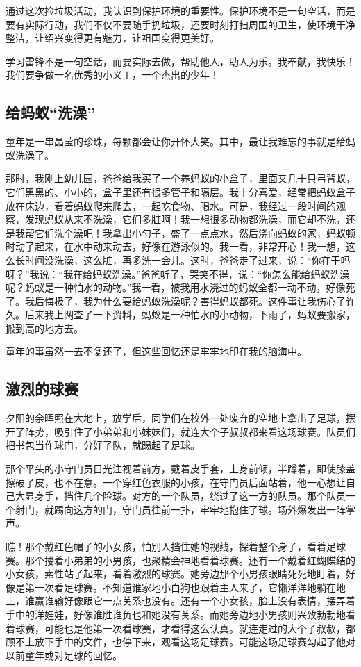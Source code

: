 \documentclass[UTF8,a4paper,titlepage,twoside,10.5pt]{article}
\begin{document}
通过这次捡垃圾活动，我认识到保护环境的重要性。保护环境不是一句空话，而是要有实际行动，我们不仅不要随手扔垃圾，还要时刻打扫周围的卫生，使环境干净整洁，让绍兴变得更有魅力，让祖国变得更美好。

学习雷锋不是一句空话，而要实际去做，帮助他人，助人为乐。我奉献，我快乐！我们要争做一名优秀的小义工，一个杰出的少年！

\subsection{给蚂蚁“洗澡”}
\label{sec:org1d765d4}

童年是一串晶莹的珍珠，每颗都会让你开怀大笑。其中，最让我难忘的事就是给蚂蚁洗澡了。

那时，我刚上幼儿园，爸爸给我买了一个养蚂蚁的小盒子，里面又几十只弓背蚁，它们黑黑的、小小的，盒子里还有很多管子和隔层。我十分喜爱，经常把蚂蚁盒子放在床边，看着蚂蚁爬来爬去，一起吃食物、喝水。可是，我经过一段时间的观察，发现蚂蚁从来不洗澡，它们多脏啊！我一想很多动物都洗澡，而它却不洗，还是我帮它们洗个澡吧！我拿出小勺子，盛了一点点水，然后浇向蚂蚁的家，蚂蚁顿时动了起来，在水中动来动去，好像在游泳似的。我一看，非常开心！我一想，这么长时间没洗澡，这么脏，再多洗一会儿。这时，爸爸走了过来，说：“你在干吗呀？”我说：“我在给蚂蚁洗澡。”爸爸听了，哭笑不得，说：“你怎么能给蚂蚁洗澡呢？蚂蚁是一种怕水的动物。”我一看，被我用水浇过的蚂蚁全都一动不动，好像死了。我后悔极了，我为什么要给蚂蚁洗澡呢？害得蚂蚁都死。这件事让我伤心了许久。后来我上网查了一下资料，蚂蚁是一种怕水的小动物，下雨了，蚂蚁要搬家，搬到高的地方去。

童年的事虽然一去不复还了，但这些回忆还是牢牢地印在我的脑海中。

\subsection{激烈的球赛}
\label{sec:orge916f1b}

夕阳的余晖照在大地上，放学后，同学们在校外一处废弃的空地上拿出了足球，摆开了阵势，吸引住了小弟弟和小妹妹们，就连大个子叔叔都来看这场球赛。队员们把书包当作球门，分好了队，就踢起了足球。

那个平头的小守门员目光注视着前方，戴着皮手套，上身前倾，半蹲着，即使膝盖擦破了皮，也不在意。一个穿红色衣服的小孩，在守门员后面站着，他一心想让自己大显身手，挡住几个险球。对方的一个队员，绕过了这一方的队员。那个队员一个射门，就踢向这方的门，守门员往前一扑，牢牢地抱住了球。场外爆发出一阵掌声。

瞧！那个戴红色帽子的小女孩，怕别人挡住她的视线，探着整个身子，看着足球赛。那个搂着小弟弟的小男孩，也聚精会神地看着球赛。还有一个戴着红蝴蝶结的小女孩，索性站了起来，看着激烈的球赛。她旁边那个小男孩眼睛死死地盯着，好像是第一次看足球赛。不知道谁家地小白狗也跟着主人来了，它懒洋洋地躺在地上，谁赢谁输好像跟它一点关系也没有。还有一个小女孩，脸上没有表情，摆弄着手中的洋娃娃，好像谁胜谁负也和她没有关系。而她旁边地小男孩则兴致勃勃地看着球赛，可能也是他第一次看球赛，才看得这么认真。就连走过的大个子叔叔，都顾不上放下手中的文件，也停下来，观看这场足球赛。可能这场足球赛勾起了他对以前童年或对足球的回忆。
\end{document}
